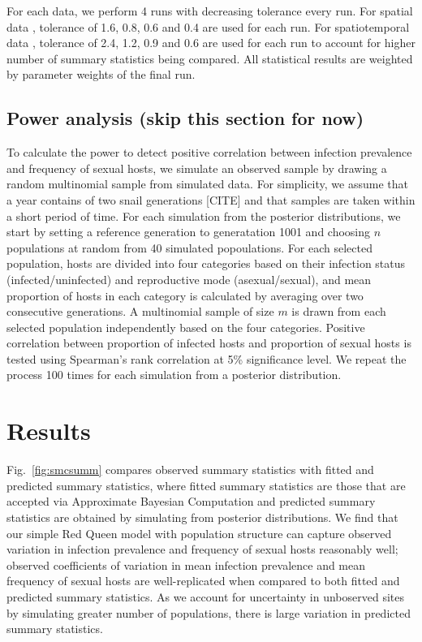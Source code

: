\documentclass{article}\usepackage[]{graphicx}\usepackage[]{color}
\newcommand{\fref}[1]{Fig.~\ref{fig:#1}}
\begin{document}
For each data, we perform 4 runs with decreasing tolerance every run.
For spatial data \citep{dagan2013clonal, mckone2016fine}, tolerance of 1.6, 0.8, 0.6 and 0.4 are used for each run.
For spatiotemporal data \citep{vergara2014infection}, tolerance of 2.4, 1.2, 0.9 and 0.6 are used for each run to account for higher number of summary statistics being compared.
All statistical results are weighted by parameter weights of the final run.

\subsection{Power analysis (skip this section for now)}


To calculate the power to detect positive correlation between infection prevalence and frequency of sexual hosts, we simulate an observed sample by drawing a random multinomial sample from simulated data.
For simplicity, we assume that a year contains of two snail generations [CITE] and that samples are taken within a short period of time.
For each simulation from the posterior distributions, we start by setting a reference generation to generatation 1001 and choosing $n$ populations at random from 40 simulated popoulations.
For each selected population, hosts are divided into four categories based on their infection status (infected/uninfected) and reproductive mode (asexual/sexual),
and mean proportion of hosts in each category is calculated by averaging over two consecutive generations.
A multinomial sample of size $m$ is drawn from each selected population independently based on the four categories. 
Positive correlation between proportion of infected hosts and proportion of sexual hosts is tested using Spearman's rank correlation at 5\% significance level.
We repeat the process 100 times for each simulation from a posterior distribution.

\section{Results}

\fref{smcsumm} compares observed summary statistics with fitted and predicted summary statistics, where fitted summary statistics are those that are accepted via Approximate Bayesian Computation and predicted summary statistics are obtained by simulating from posterior distributions.
We find that our simple Red Queen model with population structure can capture observed variation in infection prevalence and frequency of sexual hosts reasonably well; 
observed coefficients of variation in mean infection prevalence and mean frequency of sexual hosts are well-replicated when compared to both fitted and predicted summary statistics.
As we account for uncertainty in unboserved sites by simulating greater number of populations, there is large variation in predicted summary statistics.
\end{document}
